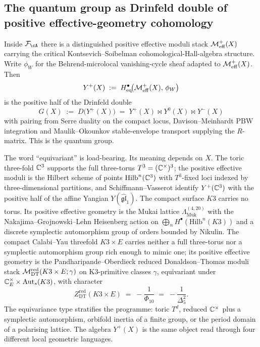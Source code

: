 \subsection*{The quantum group as Drinfeld double of positive
effective-geometry cohomology}
\label{wn:sec:platonic-preface-quantum-group-wn}

Inside $\cF_\cA$ there is a distinguished positive effective moduli
stack $\mathcal{M}^{+}_{\mathrm{eff}}(X)$ carrying the critical Kontsevich--Soibelman
cohomological-Hall-algebra structure. Write $\phi_W$ for the
Behrend-microlocal vanishing-cycle sheaf adapted to $\mathcal{M}^{+}_{\mathrm{eff}}(X)$.
Then
\[
Y^+(X) \;:=\; H^{\bullet}_{\mathrm{eq}}\!\bigl(\mathcal{M}^{+}_{\mathrm{eff}}(X),\,\phi_W\bigr)
\]
is the positive half of the Drinfeld double
\[
G(X) \;:=\; D\bigl(Y^+(X)\bigr) \;=\; Y^+(X) \bowtie Y^0(X) \bowtie Y^-(X)
\]
with pairing from Serre duality on the compact locus,
Davison--Meinhardt PBW integration and Maulik--Okounkov stable-envelope
transport supplying the $R$-matrix. This is the quantum group.

The word ``equivariant'' is load-bearing. Its meaning depends on $X$.
The toric three-fold $\mathbb{C}^3$ supports the full three-torus $T^3 =
(\mathbb{C}^\times)^3$; the positive effective moduli is the Hilbert
scheme of points $\mathrm{Hilb}^n(\mathbb{C}^3)$ with $T^3$-fixed loci indexed
by three-dimensional partitions, and Schiffmann--Vasserot identify
$Y^+(\mathbb{C}^3)$ with the positive half of the affine Yangian
$Y(\widehat{\mathfrak{gl}}_1)$. The compact surface $K3$ carries no
torus. Its positive effective geometry is the Mukai lattice
$\Lambda_{\mathrm{Muk}}^{(4,20)}$ with the Nakajima--Grojnowski--Lehn
Heisenberg action on $\bigoplus_n H^\bullet(\mathrm{Hilb}^n(K3))$ and a
discrete symplectic automorphism group of orders bounded by Nikulin.
The compact Calabi--Yau threefold $K3 \times E$ carries neither a full
three-torus nor a symplectic automorphism group rich enough to mimic
one; its positive effective geometry is the Pandharipande--Oberdieck
reduced Donaldson--Thomas moduli stack
$\mathcal{M}^{\mathrm{red}}_{\mathrm{DT}}(K3 \times E; \gamma)$ on K3-primitive
classes $\gamma$, equivariant under
$\mathbb{C}^\times_E \times \mathrm{Aut}_s(K3)$, with character
\[
Z^{\mathrm{red}}_{\mathrm{DT}}(K3 \times E) \;=\; -\frac{1}{\Phi_{10}}
\;=\; -\frac{1}{\Delta_5^2}.
\]
The equivariance type stratifies the programme: toric $T^d$, reduced
$\mathbb{C}^\times$ plus a symplectic automorphism, orbifold inertia of a
finite group, or the period domain of a polarising lattice. The
algebra $Y^+(X)$ is the same object read through four different local
geometric languages.

